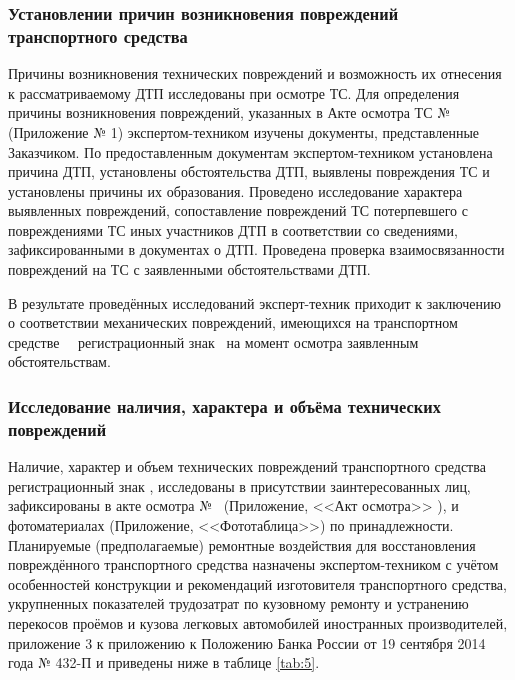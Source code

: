                        
\subsubsection{Установлении причин возникновения повреждений транспортного средства}
%    
    
    Причины возникновения технических повреждений и возможность их отнесения к
рассматриваемому ДТП исследованы при осмотре ТС. Для определения причины возникновения повреждений, указанных в Акте осмотра ТС  №  \NomerDoc\, (Приложение № 1) экспертом-техником изучены документы, представленные Заказчиком. По предоставленным документам экспертом-техником установлена причина ДТП, установлены обстоятельства ДТП, выявлены повреждения ТС и установлены причины их образования. Проведено исследование характера выявленных повреждений, сопоставление повреждений ТС потерпевшего с повреждениями ТС иных участников ДТП в соответствии со сведениями, зафиксированными в документах о ДТП.  Проведена проверка взаимосвязанности повреждений на ТС с заявленными обстоятельствами ДТП. 

В результате проведённых исследований эксперт-техник приходит к заключению о соответствии механических повреждений, имеющихся на транспортном средстве \, \, регистрационный знак \, на момент осмотра заявленным обстоятельствам. 


\subsubsection{Исследование наличия, характера и объёма технических повреждений}

  Наличие, характер и объем технических повреждений транспортного средства \tc\, регистрационный знак \grz, исследованы в присутствии заинтересованных лиц,  зафиксированы в акте осмотра № \NomerDoc\,  (Приложение, <<Акт осмотра>> ),  и фотоматериалах (Приложение, <<Фототаблица>>) по принадлежности. Планируемые (предполагаемые) ремонтные воздействия для восстановления повреждённого  транспортного средства назначены экспертом-техником с учётом особенностей конструкции и рекомендаций изготовителя  транспортного средства, укрупненных показателей трудозатрат по кузовному ремонту и устранению перекосов проёмов и кузова легковых автомобилей иностранных производителей, приложение 3 к приложению к Положению Банка России от 19 сентября 2014 года № 432-П и приведены ниже в таблице \ref{tab:5}.
 

